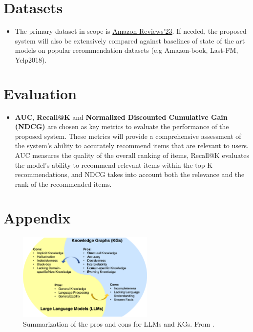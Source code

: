 \documentclass[a4paper]{article}
\begin{document}
\section*{Datasets}
\begin{itemize}
\item The primary dataset in scope is \href{https://amazon-reviews-2023.github.io/index.html}{Amazon Reviews'23}. If needed, the proposed system will also be extensively compared against baselines of state of the art models on popular recommendation datasets (e.g Amazon-book, Last-FM, Yelp2018). 
\end{itemize}
\section*{Evaluation}
\begin{itemize}
\item \textbf{AUC}, \textbf{Recall@K} and \textbf{Normalized Discounted Cumulative Gain (NDCG)} are chosen as key metrics to evaluate the performance of the proposed system. 
These metrics will provide a comprehensive assessment of the system's ability to accurately recommend items that are relevant to users. 
AUC measures the quality of the overall ranking of items, Recall@K evaluates the model's ability to recommend relevant items within the top K recommendations, and NDCG takes into account both the relevance and the rank of the recommended items.
\end{itemize}

\nocite{*}



\section*{Appendix}

\begin{figure}[H]
\centering
\includegraphics[width=0.6\textwidth]{img/PLM_vs_KG.png}
\caption{Summarization of the pros and cons for LLMs and KGs. From \cite{pan2023unifying}.}
\label{fig:llm_vs_kg}
\end{figure}
\end{document}
